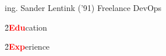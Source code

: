 \large ing.
\Huge Sander Lentink
\large ('91) Freelance DevOps
\normalsize

\h{2}{\textbf{\textcolor{red}{Edu}}cation}{}


\h{2}{\textbf{\textcolor{red}{Exp}}erience}{}

